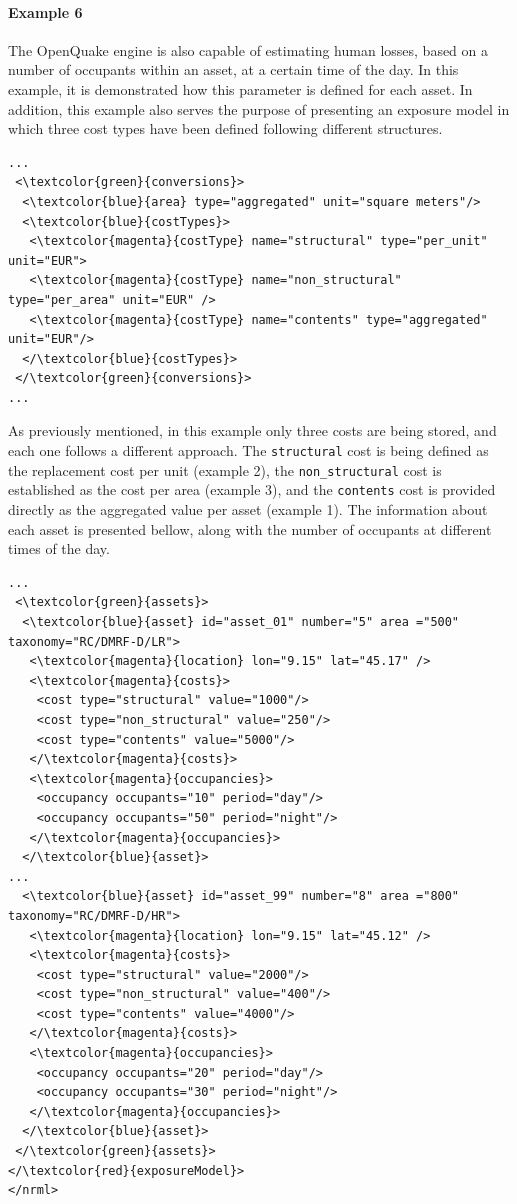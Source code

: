 \paragraph{Example 6}
The OpenQuake engine is also capable of estimating human losses, based on a number of occupants within an asset, at a certain time of the day. In this example, it is demonstrated how this parameter is defined for each asset. In addition, this example also serves the purpose of presenting an \gls{exposure model} in which three cost types have been defined following different structures.

\begin{Verbatim}[frame=single, commandchars=\\\{\}, samepage=false]
...
 <\textcolor{green}{conversions}>
  <\textcolor{blue}{area} type="aggregated" unit="square meters"/>
  <\textcolor{blue}{costTypes}>
   <\textcolor{magenta}{costType} name="structural" type="per_unit" unit="EUR">
   <\textcolor{magenta}{costType} name="non_structural" type="per_area" unit="EUR" />
   <\textcolor{magenta}{costType} name="contents" type="aggregated" unit="EUR"/>
  </\textcolor{blue}{costTypes}>
 </\textcolor{green}{conversions}>
...
\end{Verbatim}

As previously mentioned, in this example only three costs are being stored, and each one follows a different approach. The \Verb+structural+ cost is being defined as the replacement cost per unit (example 2), the \Verb+non_structural+ cost is established as the cost per area (example 3), and the \Verb+contents+ cost is provided directly as the aggregated value per asset (example 1). The information about each asset is presented bellow, along with the number of occupants at different times of the day.

\begin{Verbatim}[frame=single, commandchars=\\\{\}, samepage=false]
...
 <\textcolor{green}{assets}>
  <\textcolor{blue}{asset} id="asset_01" number="5" area ="500" taxonomy="RC/DMRF-D/LR">
   <\textcolor{magenta}{location} lon="9.15" lat="45.17" />
   <\textcolor{magenta}{costs}>
    <cost type="structural" value="1000"/>
    <cost type="non_structural" value="250"/>
    <cost type="contents" value="5000"/>
   </\textcolor{magenta}{costs}>
   <\textcolor{magenta}{occupancies}>
    <occupancy occupants="10" period="day"/>
    <occupancy occupants="50" period="night"/>
   </\textcolor{magenta}{occupancies}>
  </\textcolor{blue}{asset}>
...
  <\textcolor{blue}{asset} id="asset_99" number="8" area ="800" taxonomy="RC/DMRF-D/HR">
   <\textcolor{magenta}{location} lon="9.15" lat="45.12" />
   <\textcolor{magenta}{costs}>
    <cost type="structural" value="2000"/>
    <cost type="non_structural" value="400"/>
    <cost type="contents" value="4000"/>
   </\textcolor{magenta}{costs}>
   <\textcolor{magenta}{occupancies}>
    <occupancy occupants="20" period="day"/>
    <occupancy occupants="30" period="night"/>
   </\textcolor{magenta}{occupancies}>
  </\textcolor{blue}{asset}>
 </\textcolor{green}{assets}>
</\textcolor{red}{exposureModel}>
</nrml>
\end{Verbatim}

